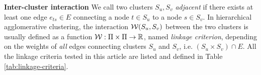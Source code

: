\textbf{Inter-cluster interaction } We call two clusters $S_u,S_v$ \emph{adjacent} if there exists at least one edge ${e_{ts}\in E}$ connecting a node $t\in S_u$ to a node $s\in S_v$. In hierarchical agglomerative clustering, the interaction $\mathcal{W}(S_u,S_v)$ between the two clusters is usually defined as a function $\mathcal{W}{}:\Pi \times \Pi \rightarrow \mathbb{R}$, named \emph{linkage criterion}, depending on the weights of \emph{all} edges connecting clusters $S_u$ and $S_v$, i.e. $(S_u \times S_v) \cap E$. 
All the linkage criteria tested in this article are listed and defined in Table \ref{tab:linkage-criteria}.




